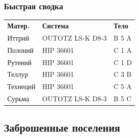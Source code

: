 \edsep

\subsubsection{Быстрая сводка}

\begin{tabular}{p{13mm}p{26mm}p{18mm}}
\rowcolor{edheaderbg}
{\color{edorange}\fontsize{6.5}{8}\selectfont\bfseries Матер.} &
{\color{edorange}\fontsize{6.5}{8}\selectfont\bfseries Система} &
{\color{edorange}\fontsize{6.5}{8}\selectfont\bfseries Тело}\\
\rowcolor{edtablebg}
{\color{edorange}\fontsize{6.5}{8}\selectfont Иттрий} &
{\color{edgraytext}\fontsize{6}{7.5}\selectfont OUTOTZ LS-K D8-3} &
{\color{edblue}\fontsize{6.5}{8}\selectfont\ttfamily B 5 A}\\
\rowcolor{edtablealt}
{\color{edorange}\fontsize{6.5}{8}\selectfont Полоний} &
{\color{edgraytext}\fontsize{6}{7.5}\selectfont HIP 36601} &
{\color{edblue}\fontsize{6.5}{8}\selectfont\ttfamily C 1 A}\\
\rowcolor{edtablebg}
{\color{edorange}\fontsize{6.5}{8}\selectfont Рутений} &
{\color{edgraytext}\fontsize{6}{7.5}\selectfont HIP 36601} &
{\color{edblue}\fontsize{6.5}{8}\selectfont\ttfamily C 1 D}\\
\rowcolor{edtablealt}
{\color{edorange}\fontsize{6.5}{8}\selectfont Теллур} &
{\color{edgraytext}\fontsize{6}{7.5}\selectfont HIP 36601} &
{\color{edblue}\fontsize{6.5}{8}\selectfont\ttfamily C 3 B}\\
\rowcolor{edtablebg}
{\color{edorange}\fontsize{6.5}{8}\selectfont Технеций} &
{\color{edgraytext}\fontsize{6}{7.5}\selectfont HIP 36601} &
{\color{edblue}\fontsize{6.5}{8}\selectfont\ttfamily C 5 A}\\
\rowcolor{edtablealt}
{\color{edorange}\fontsize{6.5}{8}\selectfont Сурьма} &
{\color{edgraytext}\fontsize{6}{7.5}\selectfont OUTOTZ LS-K D8-3} &
{\color{edblue}\fontsize{6.5}{8}\selectfont\ttfamily B 5 C}\\
\end{tabular}

\edsep

\subsection{Заброшенные поселения}


